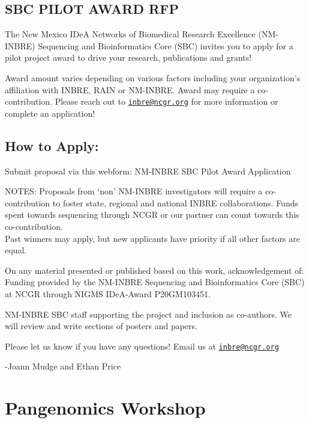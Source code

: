 \documentclass[
]{book}
\begin{document}
\hypertarget{sbc-pilot-award-rfp}{%
\section*{SBC PILOT AWARD RFP}\label{sbc-pilot-award-rfp}}

The New Mexico IDeA Networks of Biomedical Research Excellence (NM-INBRE) Sequencing and Bioinformatics Core (SBC) invites you to apply for a pilot project award to drive your research, publications and grants!

Award amount varies depending on various factors including your organization's affiliation with INBRE, RAIN or NM-INBRE. Award may require a co-contribution. Please reach out to \href{mailto:inbre@ncgr.org}{\nolinkurl{inbre@ncgr.org}} for more information or complete an application!

\hypertarget{how-to-apply}{%
\section*{How to Apply:}\label{how-to-apply}}

Submit proposal via this webform: NM-INBRE SBC Pilot Award Application\hspace{0pt}\hspace{0pt}

NOTES:
Proposals from `non' NM-INBRE investigators will require a co-contribution to foster state, regional and national INBRE collaborations. Funds spent towards sequencing through NCGR or our partner can count towards this co-contribution.\\
Past winners may apply, but new applicants have priority if all other factors are equal.

On any material presented or published based on this work, acknowledgement of:
Funding provided by the NM-INBRE Sequencing and Bioinformatics Core (SBC) at NCGR through NIGMS IDeA-Award P20GM103451.

NM-INBRE SBC staff supporting the project and inclusion as co-authors. We will review and write sections of posters and papers.

Please let us know if you have any questions! Email us at \href{mailto:inbre@ncgr.org}{\nolinkurl{inbre@ncgr.org}}

-Joann Mudge and Ethan Price

\hypertarget{pangenomics-workshop}{%
\chapter*{Pangenomics Workshop}\label{pangenomics-workshop}}
\end{document}
